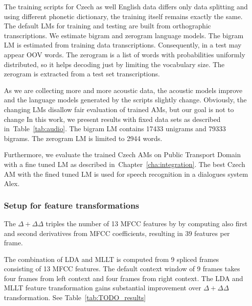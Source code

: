 The training scripts for Czech as well English data differs only data splitting and using different phonetic dictionary, the training itself remains exactly the same.
The default \acp{LM} for training and testing are built from orthographic transcriptions.
We estimate bigram and zerogram language models. 
The bigram \ac{LM} is estimated from training data transcriptions. 
Consequently, in a test may appear \acl{OOV} words.
The zerogram is a list of words with probabilities uniformly distributed, so it helps decoding just by limiting the vocabulary size.
The zerogram is extracted from a test set transcriptions.

As we are collecting more and more acoustic data, the acoustic models improve and the language models generated by the scripts slightly change.
Obviously, the changing \acp{LM} disallow fair evaluation of trained \acp{AM}, but our goal is not to change
In this work, we present results with fixed data sets as described in~Table~\ref{tab:audio}.
The bigram \ac{LM} contains 17433 unigrams and 79333 bigrams. The zerogram \ac{LM} is limited to 2944 words.


Furthermore, we evaluate the trained Czech \acp{AM} on Public Transport Domain with a fine tuned \ac{LM} as described in~Chapter~\ref{cha:integration}.
The best Czech \ac{AM} with the fined tuned \ac{LM} is used for speech recognition in a dialogues system Alex.


\subsubsection*{Setup for feature transformations}
The $\Delta + \Delta\Delta$ triples the number of 13 \ac{MFCC} features by by computing also first and second derivatives from \ac{MFCC} coefficients, resulting in 39 features per frame.

The combination of \ac{LDA} and \ac{MLLT} is computed from 9 spliced frames consisting of 13 \ac{MFCC} features. 
The default context window of 9 frames takes four frames from left context and four frames from right context.
The \ac{LDA} and \ac{MLLT} feature transformation gains substantial improvement over $\Delta+\Delta\Delta$ transformation.
See Table~\ref{tab:TODO_results}



